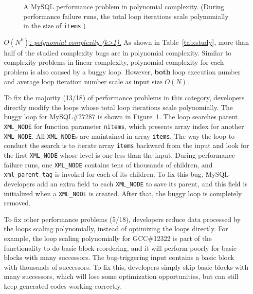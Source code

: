 \begin{figure}
\centering
{}
  \mbox{}
\caption{A MySQL performance problem in polynomial complexity. 
  (During performance failure runs, 
   the total loop iterations scale polynomially in the size of \texttt{items}.)}
\vspace{-0.05in}
\label{fig:mysql27287}
\vspace{-0.05in}
\end{figure}

{\underline{\textit{$O(N^k)$: polynomial complexity (k>1).}}}
As shown in Table~\ref{tab:study}, 
more than half of the studied complexity bugs are in polynomial complexity. 
Similar to complexity problems in linear complexity,
polynomial complexity for each problem is also caused by a buggy loop.
However, {\bf both} loop execution number and average loop iteration number
scale as input size $O(N)$.

To fix the majority (13/18) of performance problems in this category, 
developers directly modify the loops whose total loop iterations scale polynomially.  
The buggy loop for MySQL\#27287 is shown in Figure~\ref{fig:mysql27287}.
The loop searches parent \texttt{XML\_NODE} for function parameter \texttt{nitems}, 
which presents array index for another \texttt{XML\_NODE}.
All \texttt{XML\_NODE}s are maintained in array \texttt{items}. 
The way the loop to conduct the search is to iterate array \texttt{items} 
backward from the input and look for the first \texttt{XML\_NODE} 
whose level is one less than the input.
During performance failure runs, 
one \texttt{XML\_NODE} contains tens of thousands of children, 
and \texttt{xml\_parent\_tag} is invoked for each of its children. 
To fix this bug, MySQL developers add an extra field to each 
\texttt{XML\_NODE} to save its parent, 
and this field is initialized when a \texttt{XML\_NODE} is created. 
After that, the buggy loop is completely removed. 


To fix other performance problems (5/18), 
developers reduce data processed by the loops scaling polynomially, 
instead of optimizing the loops directly. 
For example, the loop scaling polynomially for GCC\#12322 is part 
of the functionality to do basic block reordering, 
and it will perform poorly for basic blocks with many successors. 
The bug-triggering input contains a basic block with thousands of successors. 
To fix this, developers simply skip basic blocks with many successors, 
which will lose some optimization opportunities, 
but can still keep generated codes working correctly. 


